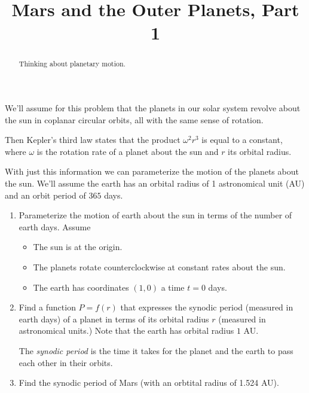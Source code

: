 \documentclass{ximera}
\title{Mars and the Outer Planets, Part 1}
\begin{document}
\begin{abstract}
Thinking about planetary motion.
\end{abstract}
\maketitle

\begin{question}  \label{QOdfthhDIDeer3gg}
We'll assume for this problem that the planets in our solar system revolve about the sun in coplanar circular orbits, all with the same sense of rotation.

Then Kepler's third law states that the product $\omega^2 r^3$ is equal to a constant, where $\omega$ is the rotation rate of a planet about the sun and $r$ its orbital radius.

With just this information we can parameterize the motion of the planets about the sun. We'll assume the earth has an orbital radius of 1 astronomical unit (AU) and an orbit period of $365$ days.  


\begin{enumerate}

\item Parameterize the motion of earth about the sun in terms of the number of earth days. Assume

\begin{itemize}

\item{The sun is at the origin.}

\item{The planets rotate counterclockwise at constant rates about the sun.} 

\item{The earth has coordinates $(1,0)$ a time $t=0$ days.}

\end{itemize}


\item Find a function $P=f(r)$ that expresses the synodic period (measured in earth days) of a planet in terms of its orbital radius $r$ (measured in astronomical units.) Note that the earth has orbital radius $1$ AU.

The \emph{synodic period} is the time it takes for the planet and the earth to pass each other in their orbits.

\item Find the synodic period of Mars (with an orbtital radius of 1.524 AU).
\end{enumerate}

\end{question}
\end{document}
